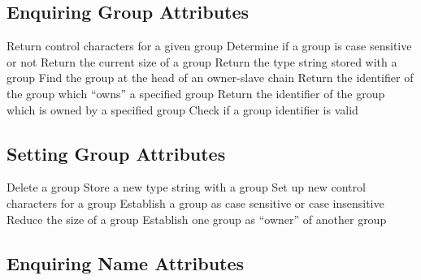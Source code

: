\subsection{Enquiring Group Attributes}

            {Return control characters for a given group}
            {Determine if a group is case sensitive or not}
            {Return the current size of a group}
            {Return the type string stored with a group}
            {Find the group at the head of an owner-slave chain}
            {Return the identifier of the group which ``owns'' a specified
group}
            {Return the identifier of the group which is owned by a
specified group}
            {Check if a group identifier is valid}


\subsection{Setting Group Attributes}

            {Delete a group}
            {Store a new type string with a group}
            {Set up new control characters for a group}
            {Establish a group as case sensitive or case insensitive}
            {Reduce the size of a group}
            {Establish one group as ``owner'' of another group}


\subsection{Enquiring Name Attributes}

